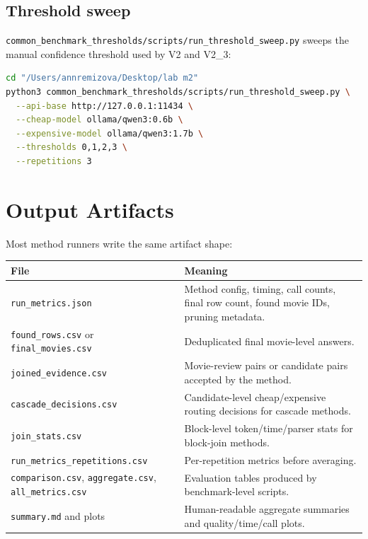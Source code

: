 \documentclass[11pt,oneside]{book}
\begin{document}
\section{Threshold sweep}
\texttt{common\_benchmark\_thresholds/scripts/run\_threshold\_sweep.py} sweeps the manual confidence threshold used by V2 and V2\_3:
\begin{lstlisting}[language=bash]
cd "/Users/annremizova/Desktop/lab m2"
python3 common_benchmark_thresholds/scripts/run_threshold_sweep.py \
  --api-base http://127.0.0.1:11434 \
  --cheap-model ollama/qwen3:0.6b \
  --expensive-model ollama/qwen3:1.7b \
  --thresholds 0,1,2,3 \
  --repetitions 3
\end{lstlisting}
\chapter{Output Artifacts}
Most method runners write the same artifact shape:
\begin{center}
\small
\renewcommand{\arraystretch}{1.25}
\begin{longtable}{@{}>{\RaggedRight\arraybackslash}p{}>{\RaggedRight\arraybackslash}p{}@{}}
\toprule
\textbf{File} & \textbf{Meaning} \\
\midrule
\endhead
\texttt{run\_metrics.json} & Method config, timing, call counts, final row count, found movie IDs, pruning metadata. \\
\texttt{found\_rows.csv} or \texttt{final\_movies.csv} & Deduplicated final movie-level answers. \\
\texttt{joined\_evidence.csv} & Movie-review pairs or candidate pairs accepted by the method. \\
\texttt{cascade\_decisions.csv} & Candidate-level cheap/expensive routing decisions for cascade methods. \\
\texttt{join\_stats.csv} & Block-level token/time/parser stats for block-join methods. \\
\texttt{run\_metrics\_repetitions.csv} & Per-repetition metrics before averaging. \\
\texttt{comparison.csv}, \texttt{aggregate.csv}, \texttt{all\_metrics.csv} & Evaluation tables produced by benchmark-level scripts. \\
\texttt{summary.md} and plots & Human-readable aggregate summaries and quality/time/call plots. \\
\bottomrule
\end{longtable}
\end{center}
\end{document}
